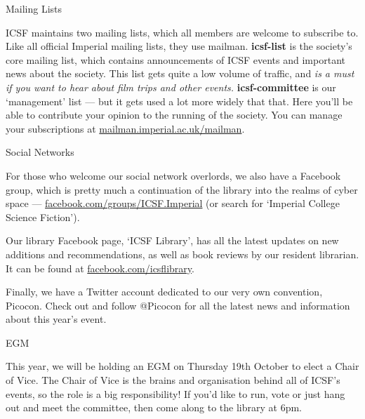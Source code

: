 \vspace{2mm} {\Large Mailing Lists}

ICSF maintains two mailing lists, which all members are welcome to subscribe to.
Like all official Imperial mailing lists, they use mailman.
%
\textbf{icsf-list} is the society's core mailing list, which contains
announcements of ICSF events and important news about the society.
This list gets quite a low volume of traffic, and \textit{is a must if
you want to hear about film trips and other events.}
%
\textbf{icsf-committee} is our `management' list --- but it gets used a
lot more widely that that. Here you'll be able to contribute your opinion
to the running of the society.
%
You can manage your subscriptions at \url{mailman.imperial.ac.uk/mailman}.

\vspace{5mm}

{\Large Social Networks}

For those who welcome our social network overlords, we also have a Facebook
group, which is pretty much a continuation of the library into the
realms of cyber space --- \url{facebook.com/groups/ICSF.Imperial} (or search for
`Imperial College Science Fiction').

Our library Facebook page, `ICSF Library', has all the latest updates on new additions and recommendations, as well as book reviews by our resident librarian. It can be found at \url{facebook.com/icsflibrary}.

Finally, we have a Twitter account dedicated to our very own convention, Picocon. Check out and follow @Picocon for all the latest news and information about this year's event.

\vspace{5mm}

{\Large EGM}

This year, we will be holding an EGM on Thursday 19th October to elect a Chair of Vice. The Chair of Vice is the brains and organisation behind all of ICSF's events, so the role is a big responsibility! If you'd like to run, vote or just hang out and meet the committee, then come along to the library at 6pm.

\vspace{-10mm}
